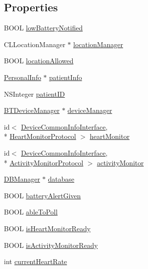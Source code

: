 \subsection*{Properties}
\begin{DoxyCompactItemize}
\item 
B\-O\-O\-L \hyperlink{interface_device_poll_manager_a265079b7aa0e9cc69818fb49835bd175}{low\-Battery\-Notified}
\item 
C\-L\-Location\-Manager $\ast$ \hyperlink{interface_device_poll_manager_ad710c38392bfc32d3509de470e0cfa8d}{location\-Manager}
\item 
B\-O\-O\-L \hyperlink{interface_device_poll_manager_a0e9aad6cc4f5a99aff27b0a64ae76d19}{location\-Allowed}
\item 
\hyperlink{interface_personal_info}{Personal\-Info} $\ast$ \hyperlink{interface_device_poll_manager_a8739ffcaa2b1e02afc1864e338de148f}{patient\-Info}
\item 
N\-S\-Integer \hyperlink{interface_device_poll_manager_a621e3962372201145248997e2eb87327}{patient\-I\-D}
\item 
\hyperlink{interface_b_t_device_manager}{B\-T\-Device\-Manager} $\ast$ \hyperlink{interface_device_poll_manager_a813e014763804b71e247ca335fe91761}{device\-Manager}
\item 
id$<$ \hyperlink{protocol_device_common_info_interface-p}{Device\-Common\-Info\-Interface}, \\*
\hyperlink{protocol_heart_monitor_protocol-p}{Heart\-Monitor\-Protocol} $>$ \hyperlink{interface_device_poll_manager_a5d06bcab588b72afdf5fce4c102afe91}{heart\-Monitor}
\item 
id$<$ \hyperlink{protocol_device_common_info_interface-p}{Device\-Common\-Info\-Interface}, \\*
\hyperlink{protocol_activity_monitor_protocol-p}{Activity\-Monitor\-Protocol} $>$ \hyperlink{interface_device_poll_manager_a1e33e8f7da83c22dccb6c3b3b7d66069}{activity\-Monitor}
\item 
\hyperlink{interface_d_b_manager}{D\-B\-Manager} $\ast$ \hyperlink{interface_device_poll_manager_a66a02f95a478a42c7e45986317e3c6c1}{database}
\item 
B\-O\-O\-L \hyperlink{interface_device_poll_manager_a8d5b5ff2c336f0dd2cb2b9e088850072}{battery\-Alert\-Given}
\item 
B\-O\-O\-L \hyperlink{interface_device_poll_manager_abe71cba97ae5b0faef77e70b78f2bef2}{able\-To\-Poll}
\item 
B\-O\-O\-L \hyperlink{interface_device_poll_manager_a4735e7c0b634e8693ac8d33a0456d39f}{is\-Heart\-Monitor\-Ready}
\item 
B\-O\-O\-L \hyperlink{interface_device_poll_manager_aeab69bf0530fcf7d3f1b01c785e17bd2}{is\-Activity\-Monitor\-Ready}
\item 
int \hyperlink{interface_device_poll_manager_a302b6434aa606031f78f721c9e40f0cf}{current\-Heart\-Rate}
\end{DoxyCompactItemize}


